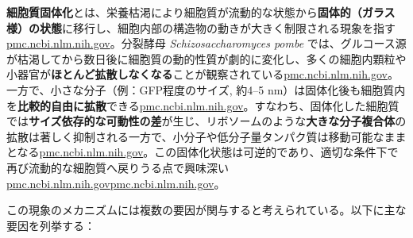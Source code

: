 \textbf{細胞質固体化}とは、栄養枯渇により細胞質が流動的な状態から\textbf{固体的（ガラス様）の状態}に移行し、細胞内部の構造物の動きが大きく制限される現象を指す\href{https://pmc.ncbi.nlm.nih.gov/articles/PMC6857596/\#:~:text=run\%20out\%20of\%20nutrients,2016\%20\%3B\%20\%2043}{pmc.ncbi.nlm.nih.gov}。分裂酵母 \textit{Schizosaccharomyces pombe} では、グルコース源が枯渇してから数日後に細胞質の動的性質が劇的に変化し、多くの細胞内顆粒や小器官が\textbf{ほとんど拡散しなくなる}ことが観察されている\href{https://pmc.ncbi.nlm.nih.gov/articles/PMC6857596/\#:~:text=run\%20out\%20of\%20nutrients,2016\%20\%3B\%20\%2043}{pmc.ncbi.nlm.nih.gov}。一方で、小さな分子（例：GFP程度のサイズ, 約4–5 nm）は固体化後も細胞質内を\textbf{比較的自由に拡散}できる\href{https://pmc.ncbi.nlm.nih.gov/articles/PMC6857596/\#:~:text=run\%20out\%20of\%20nutrients,2016\%20\%3B\%20\%2043}{pmc.ncbi.nlm.nih.gov}。すなわち、固体化した細胞質では\textbf{サイズ依存的な可動性の差}が生じ、リボソームのような\textbf{大きな分子複合体}の拡散は著しく抑制される一方で、小分子や低分子量タンパク質は移動可能なままとなる\href{https://pmc.ncbi.nlm.nih.gov/articles/PMC11214080/\#:~:text=spores\%20and\%20uncovered\%20signaling\%20pathways,such\%20as\%20ribosomes\%2C\%20is\%20restricted}{pmc.ncbi.nlm.nih.gov}。この固体化状態は可逆的であり、適切な条件下で再び流動的な細胞質へ戻りうる点で興味深い\href{https://pmc.ncbi.nlm.nih.gov/articles/PMC6857596/\#:~:text=Cells\%20depend\%20on\%20a\%20highly,dependent\%20manner.\%20We}{pmc.ncbi.nlm.nih.gov}\href{https://pmc.ncbi.nlm.nih.gov/articles/PMC6857596/\#:~:text=provide\%20experimental\%20evidence\%20that\%2C\%20in,cellular\%20architecture\%20in\%20dormant\%20cells}{pmc.ncbi.nlm.nih.gov}。

この現象のメカニズムには複数の要因が関与すると考えられている。以下に主な要因を列挙する：

